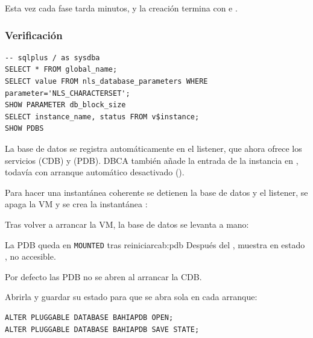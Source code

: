 Esta vez cada fase tarda minutos, y la creación termina con
 e
.

\subsubsection{Verificación}

\begin{lstlisting}[style=sql]
-- sqlplus / as sysdba
SELECT * FROM global_name;
SELECT value FROM nls_database_parameters WHERE parameter='NLS_CHARACTERSET';
SHOW PARAMETER db_block_size
SELECT instance_name, status FROM v$instance;
SHOW PDBS
\end{lstlisting}


La base de datos se registra automáticamente en el listener, que ahora ofrece
los servicios  (CDB) y  (PDB). DBCA también
añade la entrada de la instancia en , todavía con arranque
automático desactivado ().


Para hacer una instantánea coherente se detienen la base de datos y el listener,
se apaga la VM y se crea la instantánea :


Tras volver a arrancar la VM, la base de datos se levanta a mano:


\begin{cabezazo}[unbreakable]{La PDB queda en \texttt{MOUNTED} tras reiniciar}{cab:pdb}
\problema Después del ,  muestra
 en estado , no accesible.

\causa Por defecto las PDB no se abren al arrancar la CDB.

\solucion Abrirla y guardar su estado para que se abra sola en cada
arranque:

\begin{lstlisting}[style=sql]
ALTER PLUGGABLE DATABASE BAHIAPDB OPEN;
ALTER PLUGGABLE DATABASE BAHIAPDB SAVE STATE;
\end{lstlisting}
\end{cabezazo}

